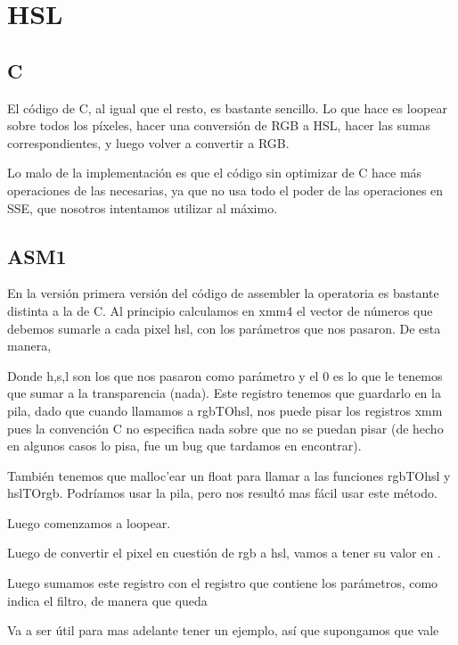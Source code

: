 \section{HSL}

\subsection{C}
El código de C, al igual que el resto, es bastante sencillo. Lo que hace es loopear sobre todos los píxeles, hacer una conversión de RGB a HSL, hacer las sumas correspondientes, y luego volver a convertir a RGB.

Lo malo de la implementación es que el código sin optimizar de C hace más operaciones de las necesarias, ya que no usa todo el poder de las operaciones en SSE, que nosotros intentamos utilizar al máximo.

\subsection{ASM1}

En la versión primera versión del código de assembler la operatoria es bastante distinta a la de C.
Al principio calculamos en xmm4 el vector de números que debemos sumarle a cada pixel hsl, con los parámetros que nos pasaron. De esta manera, 


Donde h,s,l son los que nos pasaron como parámetro y el 0 es lo que le tenemos que sumar a la transparencia (nada). Este registro tenemos que guardarlo en la pila, dado que cuando llamamos a rgbTOhsl, nos puede pisar los registros xmm pues la convención C no especifica nada sobre que no se puedan pisar (de hecho en algunos casos lo pisa, fue un bug que tardamos en encontrar).

También tenemos que malloc'ear un float para llamar a las funciones rgbTOhsl y hslTOrgb. Podríamos usar la pila, pero nos resultó mas fácil usar este método.

Luego comenzamos a loopear. 

Luego de convertir el pixel en cuestión de rgb a hsl, vamos a tener su valor en .


Luego sumamos este registro con el registro que contiene los parámetros, como indica el filtro, de manera que queda


Va a ser útil para mas adelante tener un ejemplo, así que supongamos que  vale

